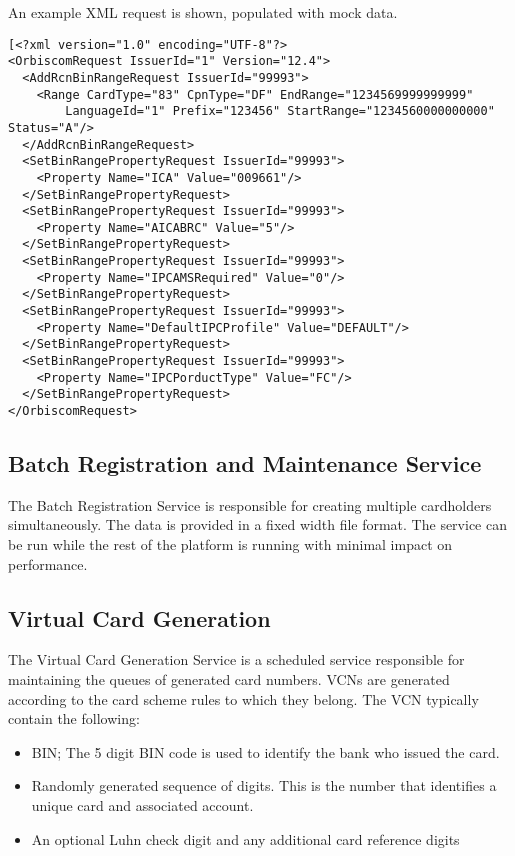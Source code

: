 \documentclass[a4paper, 11pt, titlepage]{article}
\begin{document}
An example XML request is shown, populated with mock data. 
\begin{verbatim} 
[<?xml version="1.0" encoding="UTF-8"?> 
<OrbiscomRequest IssuerId="1" Version="12.4"> 
  <AddRcnBinRangeRequest IssuerId="99993"> 
    <Range CardType="83" CpnType="DF" EndRange="1234569999999999" 
        LanguageId="1" Prefix="123456" StartRange="1234560000000000" Status="A"/> 
  </AddRcnBinRangeRequest> 
  <SetBinRangePropertyRequest IssuerId="99993"> 
    <Property Name="ICA" Value="009661"/> 
  </SetBinRangePropertyRequest> 
  <SetBinRangePropertyRequest IssuerId="99993"> 
    <Property Name="AICABRC" Value="5"/> 
  </SetBinRangePropertyRequest> 
  <SetBinRangePropertyRequest IssuerId="99993"> 
    <Property Name="IPCAMSRequired" Value="0"/> 
  </SetBinRangePropertyRequest> 
  <SetBinRangePropertyRequest IssuerId="99993"> 
    <Property Name="DefaultIPCProfile" Value="DEFAULT"/> 
  </SetBinRangePropertyRequest> 
  <SetBinRangePropertyRequest IssuerId="99993"> 
    <Property Name="IPCPorductType" Value="FC"/> 
  </SetBinRangePropertyRequest> 
</OrbiscomRequest> 
\end{verbatim} 
 
 
\subsection{Batch Registration and Maintenance Service} 
The Batch Registration Service is responsible for creating multiple cardholders simultaneously. The data is provided in a fixed width file format. The service can be run while the rest of the platform is running with minimal impact on performance.
 
 
\subsection{Virtual Card Generation} 
The Virtual Card Generation Service is a scheduled service responsible for maintaining the queues of generated card numbers. VCNs are generated according to the card scheme rules to which they belong. The VCN typically contain the following:
\begin{itemize}
\item \label{bin_range} BIN; The 5 digit BIN code is used to identify the bank who issued the card.
\item Randomly generated sequence of digits. This is the number that identifies a unique card and associated account.
\item An optional Luhn check digit and any additional card reference digits
\end{itemize}
\end{document}
